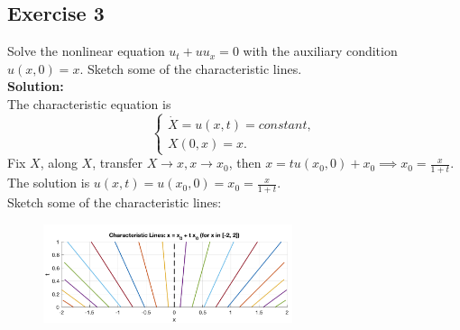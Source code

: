 \documentclass[12pt]{article}%
\begin{document}
\subsection*{Exercise 3}
Solve the nonlinear equation $u_{t}+uu_{x}=0$ with the auxiliary condition $u(x,0)=x$. Sketch some of the characteristic lines.\\
\textbf{Solution:}\\
The characteristic equation is \begin{equation*}
    \begin{cases}
     \dot{X} =u(x,t)=constant, \\
      X(0,x) =x.
    \end{cases}
\end{equation*} %
Fix $X$, along $X$, transfer $X\to x, x\to x_{0}$, then $x=tu(x_{0},0)+x_{0}\implies x_{0}=\frac{x}{1+t}$.\\
The solution is $u(x,t)=u(x_{0},0)=x_{0}=\frac{x}{1+t}.$\\
Sketch some of the characteristic lines:

\begin{figure}[h]
    \centering
    \includegraphics[width=0.65\textwidth]{Graph 1.png} %
    \label{fig:The first graph of characteristic lines}
  \end{figure}
\end{document}
